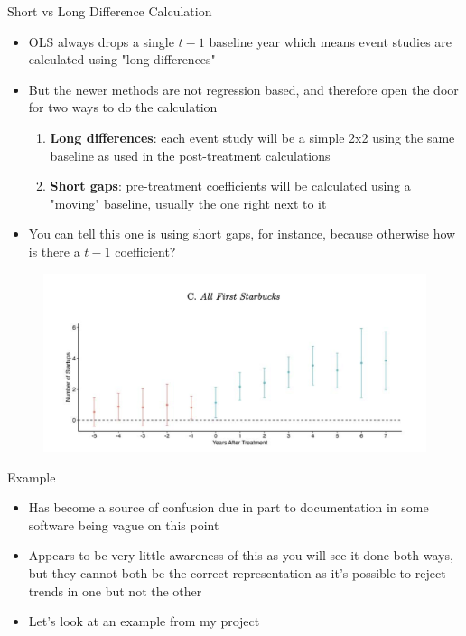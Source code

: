 \documentclass{beamer}
\begin{document}
\begin{frame}{Short vs Long Difference Calculation}

\begin{itemize}
\item OLS always drops a single $t-1$ baseline year which means event studies are calculated using "long differences"
\item But the newer methods are not regression based, and therefore open the door for two ways to do the calculation
	\begin{enumerate}
	\item \textbf{Long differences}: each event study will be a simple 2x2 using the same baseline as used in the post-treatment calculations
	\item \textbf{Short gaps}: pre-treatment coefficients will be calculated using a "moving" baseline, usually the one right next to it
	\end{enumerate}
\item You can tell this one is using short gaps, for instance, because otherwise how is there a $t-1$ coefficient?
\end{itemize}

\end{frame}


\begin{frame}

\begin{figure}
    \centering
    \includegraphics[height=0.5\textheight]{./lecture_includes/magic_johnson_eventstudy}
\end{figure}

\end{frame}



\begin{frame}{Example}

\begin{itemize}

\item Has become a source of confusion due in part to documentation in some software being vague on this point
\item Appears to be very little awareness of this as you will see it done both ways, but they cannot both be the correct representation as it's possible to reject trends in one but not the other 
\item Let's look at an example from my project
\end{itemize}

\end{frame}
\end{document}
